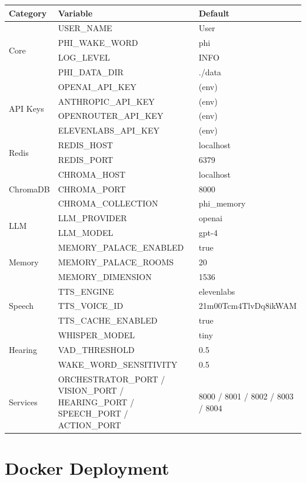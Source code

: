 \documentclass[12pt,a4paper,twoside]{report}
\begin{document}
\begin{longtable}{|l|l|l|}
\hline
\rowcolor{phiblue!20}
\textbf{Category} & \textbf{Variable} & \textbf{Default} \\
\hline
\multirow{4}{*}{Core} & USER\_NAME & User \\
 & PHI\_WAKE\_WORD & phi \\
 & LOG\_LEVEL & INFO \\
 & PHI\_DATA\_DIR & ./data \\
\hline
\multirow{4}{*}{API Keys} & OPENAI\_API\_KEY & (env) \\
 & ANTHROPIC\_API\_KEY & (env) \\
 & OPENROUTER\_API\_KEY & (env) \\
 & ELEVENLABS\_API\_KEY & (env) \\
\hline
\multirow{2}{*}{Redis} & REDIS\_HOST & localhost \\
 & REDIS\_PORT & 6379 \\
\hline
\multirow{3}{*}{ChromaDB} & CHROMA\_HOST & localhost \\
 & CHROMA\_PORT & 8000 \\
 & CHROMA\_COLLECTION & phi\_memory \\
\hline
\multirow{2}{*}{LLM} & LLM\_PROVIDER & openai \\
 & LLM\_MODEL & gpt-4 \\
\hline
\multirow{3}{*}{Memory} & MEMORY\_PALACE\_ENABLED & true \\
 & MEMORY\_PALACE\_ROOMS & 20 \\
 & MEMORY\_DIMENSION & 1536 \\
\hline
\multirow{3}{*}{Speech} & TTS\_ENGINE & elevenlabs \\
 & TTS\_VOICE\_ID & 21m00Tcm4TlvDq8ikWAM \\
 & TTS\_CACHE\_ENABLED & true \\
\hline
\multirow{3}{*}{Hearing} & WHISPER\_MODEL & tiny \\
 & VAD\_THRESHOLD & 0.5 \\
 & WAKE\_WORD\_SENSITIVITY & 0.5 \\
\hline
Services & ORCHESTRATOR\_PORT / VISION\_PORT / HEARING\_PORT / SPEECH\_PORT / ACTION\_PORT & 8000 / 8001 / 8002 / 8003 / 8004 \\
\hline
\end{longtable}
\caption{Key Configuration Environment Variables}

\section{Docker Deployment}
\end{document}
